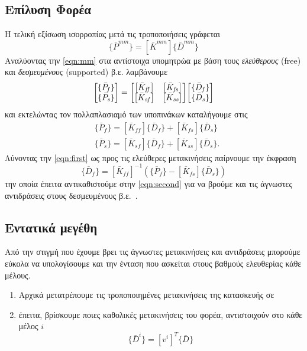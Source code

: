\documentclass[a4paper, twocolumn]{article}
\newcommand{\vect}[1]{ \{ #1\} }
\newcommand{\mat}[1]{\left[ #1 \right]}
\newcommand{\Gstiff}[1]{\mat{\bar{K}^{\mathit{#1}}}}
\newcommand{\gforce}[1]{\vect{\bar{P}^{\mathit{#1}}}}
\newcommand{\gdisp}[1]{\vect{\bar{D}^{\mathit{#1}}}}
\newcommand{\subk}[1]{ \mat{\bar{K}_{\mathit{#1}}} }
\newcommand{\subp}[1]{\vect{\bar{P}_{\mathit{#1}}}}
\newcommand{\subd}[1]{\vect{\bar{D}_{\mathit{#1}}}}
\begin{document}
\subsection{Επίλυση Φορέα}
Η τελική εξίσωση ισορροπίας μετά τις τροποποιήσεις γράφεται
	\begin{equation}\label{eqn:mm}
		\gforce{mm} = \Gstiff{mm} \gdisp{mm}
	\end{equation}
Αναλύοντας την \ref{eqn:mm} στα αντίστοιχα υπομητρώα με βάση τους 
\emph{ελεύθερους} (free) και \emph{δεσμευμένους} (supported) β.ε. 
λαμβάνουμε
	\begin{equation}
		\mqty[ \subp{f} \\ \subp{s} ] = 
		\mqty[ \subk{ff} & \subk{fs} \\
		\subk{sf}& \subk{ss} ] 
		\mqty[ \subd{f} \\ \subd{s} ]
	\end{equation}
και εκτελώντας τον πολλαπλασιαμό των υποπινάκων καταλήγουμε στις
	\begin{align}
	 	&\subp{f} = \subk{ff} \subd{f} + \subk{fs} \subd{s} 
	 	\label{eqn:first} \\
		&\subp{s} = \subk{sf} \subd{f} + \subk{ss} \subd{s}. 
		\label{eqn:second}
	\end{align}
Λύνοντας την \ref{eqn:first} ως προς τις ελεύθερες 
μετακινήσεις παίρνουμε την έκφραση
	\begin{equation}
		\subd{f} 
		= \subk{ff}^{-1} ( \subp{f} - \subk{fs} \subd{s} ) 
		\label{eqn:dfree} 
	\end{equation}
την οποία έπειτα αντικαθιστούμε στην 
\ref{eqn:second} για να βρούμε και τις άγνωστες αντιδράσεις στους 
δεσμευμένους β.ε.~.

\subsection{Εντατικά μεγέθη}
Από την στιγμή που έχουμε βρει τις άγνωστες μετακινήσεις και 
αντιδράσεις μπορούμε εύκολα να υπολογίσουμε και την ένταση που 
ασκείται στους βαθμούς ελευθερίας κάθε μέλους.

\begin{enumerate}
	\item Αρχικά μετατρέπουμε τις τροποποιημένες μετακινήσεις της 
	κατασκευής σε 
	\item έπειτα, βρίσκουμε ποιες καθολικές μετακινήσεις του φορέα, 
	αντιστοιχούν στο κάθε μέλος $i$
	\begin{equation}
		\gdisp{i} = \mat{v^i}^T \gdisp{}
	\end{equation}
\end{enumerate}
\end{document}

